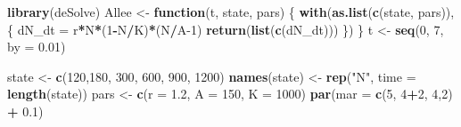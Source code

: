 \documentclass[
]{book}
\newenvironment{Shaded}{\begin{snugshade}}{\end{snugshade}}
\newcommand{\AttributeTok}[1]{\textcolor[rgb]{0.13,0.29,0.53}{#1}}
\newcommand{\ControlFlowTok}[1]{\textcolor[rgb]{0.13,0.29,0.53}{\textbf{#1}}}
\newcommand{\DecValTok}[1]{\textcolor[rgb]{0.00,0.00,0.81}{#1}}
\newcommand{\FloatTok}[1]{\textcolor[rgb]{0.00,0.00,0.81}{#1}}
\newcommand{\FunctionTok}[1]{\textcolor[rgb]{0.13,0.29,0.53}{\textbf{#1}}}
\newcommand{\NormalTok}[1]{#1}
\newcommand{\OtherTok}[1]{\textcolor[rgb]{0.56,0.35,0.01}{#1}}
\newcommand{\SpecialCharTok}[1]{\textcolor[rgb]{0.81,0.36,0.00}{\textbf{#1}}}
\newcommand{\StringTok}[1]{\textcolor[rgb]{0.31,0.60,0.02}{#1}}
\begin{document}
\begin{Shaded}
\begin{Highlighting}[]
\FunctionTok{library}\NormalTok{(deSolve)}
\NormalTok{Allee }\OtherTok{\textless{}{-}} \ControlFlowTok{function}\NormalTok{(t, state, pars) \{}
  \FunctionTok{with}\NormalTok{(}\FunctionTok{as.list}\NormalTok{(}\FunctionTok{c}\NormalTok{(state, pars)), \{}
\NormalTok{    dN\_dt }\OtherTok{=}\NormalTok{ r}\SpecialCharTok{*}\NormalTok{N}\SpecialCharTok{*}\NormalTok{(}\DecValTok{1}\SpecialCharTok{{-}}\NormalTok{N}\SpecialCharTok{/}\NormalTok{K)}\SpecialCharTok{*}\NormalTok{(N}\SpecialCharTok{/}\NormalTok{A}\DecValTok{{-}1}\NormalTok{)}
    \FunctionTok{return}\NormalTok{(}\FunctionTok{list}\NormalTok{(}\FunctionTok{c}\NormalTok{(dN\_dt)))}
\NormalTok{    \})}
\NormalTok{\}}
\NormalTok{t }\OtherTok{\textless{}{-}} \FunctionTok{seq}\NormalTok{(}\DecValTok{0}\NormalTok{, }\DecValTok{7}\NormalTok{, }\AttributeTok{by =} \FloatTok{0.01}\NormalTok{)}

\NormalTok{state }\OtherTok{\textless{}{-}} \FunctionTok{c}\NormalTok{(}\DecValTok{120}\NormalTok{,}\DecValTok{180}\NormalTok{, }\DecValTok{300}\NormalTok{, }\DecValTok{600}\NormalTok{, }\DecValTok{900}\NormalTok{, }\DecValTok{1200}\NormalTok{)}
\FunctionTok{names}\NormalTok{(state) }\OtherTok{\textless{}{-}} \FunctionTok{rep}\NormalTok{(}\StringTok{"N"}\NormalTok{, }\AttributeTok{time =} \FunctionTok{length}\NormalTok{(state))}
\NormalTok{pars }\OtherTok{\textless{}{-}} \FunctionTok{c}\NormalTok{(}\AttributeTok{r =} \FloatTok{1.2}\NormalTok{, }\AttributeTok{A =} \DecValTok{150}\NormalTok{, }\AttributeTok{K =} \DecValTok{1000}\NormalTok{)}
\FunctionTok{par}\NormalTok{(}\AttributeTok{mar =} \FunctionTok{c}\NormalTok{(}\DecValTok{5}\NormalTok{, }\DecValTok{4}\SpecialCharTok{+}\DecValTok{2}\NormalTok{, }\DecValTok{4}\NormalTok{,}\DecValTok{2}\NormalTok{) }\SpecialCharTok{+} \FloatTok{0.1}\NormalTok{)}


\end{Highlighting}
\end{Shaded}
\end{document}
